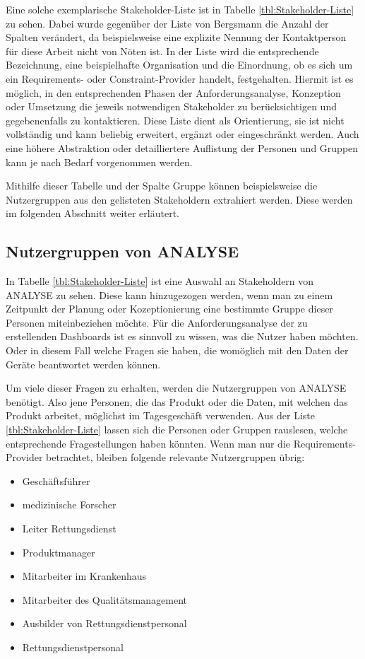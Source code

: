 Eine solche exemplarische Stakeholder-Liste ist in Tabelle \ref{tbl:Stakeholder-Liste} zu sehen.
Dabei wurde gegenüber der Liste von Bergsmann die Anzahl der Spalten verändert, da beispielsweise eine explizite Nennung der Kontaktperson für diese Arbeit nicht von Nöten ist.
In der Liste wird die entsprechende Bezeichnung, eine beispielhafte Organisation und die Einordnung, ob es sich um ein Requirements- oder Constraint-Provider handelt, festgehalten.
Hiermit ist es möglich, in den entsprechenden Phasen der Anforderungsanalyse, Konzeption oder Umsetzung die jeweils notwendigen Stakeholder zu berücksichtigen und gegebenenfalls zu kontaktieren. 
Diese Liste dient als Orientierung, sie ist nicht vollständig und kann beliebig erweitert, ergänzt oder eingeschränkt werden.
Auch eine höhere Abstraktion oder detailliertere Auflistung der Personen und Gruppen kann je nach Bedarf vorgenommen werden. 

Mithilfe dieser Tabelle und der Spalte \glqq Gruppe\grqq{} können beispielsweise die Nutzergruppen aus den gelisteten Stakeholdern extrahiert werden.
Diese werden im folgenden Abschnitt weiter erläutert.

\subsection{Nutzergruppen von \acrlong*{ANALYSE}}
\label{sub:NutzergruppenAnalyse}
In Tabelle \ref{tbl:Stakeholder-Liste} ist eine Auswahl an Stakeholdern von \gls{ANALYSE} zu sehen.
Diese kann hinzugezogen werden, wenn man zu einem Zeitpunkt der Planung oder Kozeptionierung eine bestimmte Gruppe dieser Personen miteinbeziehen möchte.
Für die Anforderungsanalyse der zu erstellenden \gls{Dashboard}s ist es sinnvoll zu wissen, was die Nutzer haben möchten.
Oder in diesem Fall welche Fragen sie haben, die womöglich mit den Daten der Geräte beantwortet werden können.

Um viele dieser Fragen zu erhalten, werden die Nutzergruppen von \gls{ANALYSE} benötigt.
Also jene Personen, die das Produkt oder die Daten, mit welchen das Produkt arbeitet, möglichst im Tagesgeschäft verwenden.
Aus der Liste \ref{tbl:Stakeholder-Liste} lassen sich die Personen oder Gruppen rauslesen, welche entsprechende Fragestellungen haben könnten. 
Wenn man nur die Requirements-Provider betrachtet, bleiben folgende relevante Nutzergruppen übrig:
\begin{multicols}{2}
\begin{itemize}
\item Geschäftsführer
\item medizinische Forscher
\item Leiter Rettungsdienst
\item Produktmanager
\item Mitarbeiter im Krankenhaus
\item Mitarbeiter des Qualitätsmanagement
\item Ausbilder von Rettungsdienstpersonal
\item Rettungsdienstpersonal
\end{itemize}
\end{multicols}

